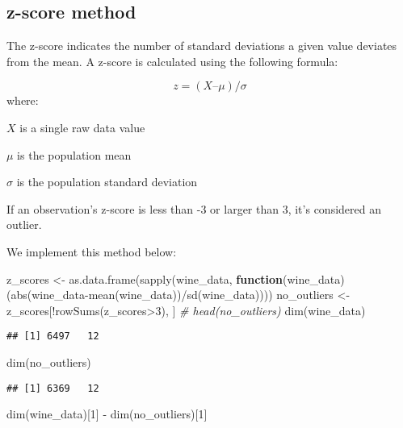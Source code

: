 \documentclass[
]{article}
\newenvironment{Shaded}{\begin{snugshade}}{\end{snugshade}}
\newcommand{\CommentTok}[1]{\textcolor[rgb]{0.56,0.35,0.01}{\textit{#1}}}
\newcommand{\ControlFlowTok}[1]{\textcolor[rgb]{0.13,0.29,0.53}{\textbf{#1}}}
\newcommand{\DecValTok}[1]{\textcolor[rgb]{0.00,0.00,0.81}{#1}}
\newcommand{\FunctionTok}[1]{\textcolor[rgb]{0.00,0.00,0.00}{#1}}
\newcommand{\NormalTok}[1]{#1}
\newcommand{\OtherTok}[1]{\textcolor[rgb]{0.56,0.35,0.01}{#1}}
\newcommand{\SpecialCharTok}[1]{\textcolor[rgb]{0.00,0.00,0.00}{#1}}
\begin{document}
\hypertarget{z-score-method}{%
\subsection{z-score method}\label{z-score-method}}

The z-score indicates the number of standard deviations a given value
deviates from the mean. A z-score is calculated using the following
formula:

\[z = (X – \mu) / \sigma\] where:

\(X\) is a single raw data value

\(\mu\) is the population mean

\(\sigma\) is the population standard deviation

If an observation's z-score is less than -3 or larger than 3, it's
considered an outlier.

We implement this method below:

\begin{Shaded}
\begin{Highlighting}[]
\NormalTok{z\_scores }\OtherTok{\textless{}{-}} \FunctionTok{as.data.frame}\NormalTok{(}\FunctionTok{sapply}\NormalTok{(wine\_data, }\ControlFlowTok{function}\NormalTok{(wine\_data) (}\FunctionTok{abs}\NormalTok{(wine\_data}\SpecialCharTok{{-}}\FunctionTok{mean}\NormalTok{(wine\_data))}\SpecialCharTok{/}\FunctionTok{sd}\NormalTok{(wine\_data))))    }
\NormalTok{no\_outliers }\OtherTok{\textless{}{-}}\NormalTok{ z\_scores[}\SpecialCharTok{!}\FunctionTok{rowSums}\NormalTok{(z\_scores}\SpecialCharTok{\textgreater{}}\DecValTok{3}\NormalTok{), ]}
\CommentTok{\# head(no\_outliers)}
\FunctionTok{dim}\NormalTok{(wine\_data)}
\end{Highlighting}
\end{Shaded}

\begin{verbatim}
## [1] 6497   12
\end{verbatim}

\begin{Shaded}
\begin{Highlighting}[]
\FunctionTok{dim}\NormalTok{(no\_outliers)}
\end{Highlighting}
\end{Shaded}

\begin{verbatim}
## [1] 6369   12
\end{verbatim}

\begin{Shaded}
\begin{Highlighting}[]
\FunctionTok{dim}\NormalTok{(wine\_data)[}\DecValTok{1}\NormalTok{] }\SpecialCharTok{{-}} \FunctionTok{dim}\NormalTok{(no\_outliers)[}\DecValTok{1}\NormalTok{]}
\end{Highlighting}
\end{Shaded}
\end{document}
